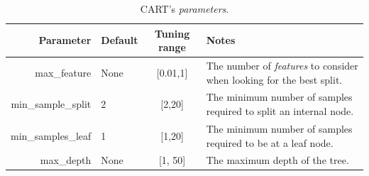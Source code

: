 \documentclass[10pt,conference]{IEEEtran}
\newcommand{\bi}{\begin{itemize}}
\newcommand{\ei}{\end{itemize}}
\begin{document}
\begin{table}[!t]
\scriptsize
\caption{CART's {\em parameters}.}\label{tbl:cart}
\begin{tabular}{rlcp{1.3in}}

Parameter & Default & Tuning range & Notes\\\hline 

	  max\_feature & None &[0.01,1]& The number of {\em features} to consider when looking for the best 
split. \\\hline
	 min\_sample\_split & 2 &[2,20]& The minimum number of samples required to split an 
internal node. \\ \hline
  min\_samples\_leaf & 1 & [1,20]&The minimum number of samples required to be at a leaf 
node. \\ \hline
     max\_depth & None & [1, 50]& The maximum depth of the tree. 
\end{tabular}  
\end{table}


 
  



\end{document}
